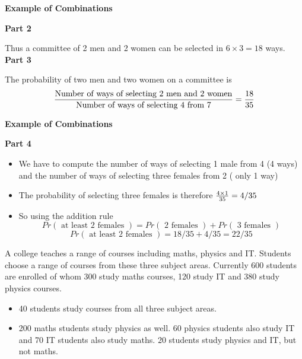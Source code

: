 \documentclass[]{report}
\begin{document}
	
	{
		\textbf{Example of Combinations}
		
		\textbf{Part 2}
		
		Thus a committee of 2 men and 2 women can be selected in $ 6 \times 3  = 18 $ ways.\\
		
		\textbf{Part 3}
		
		The probability of two men and two women on a committee is
		\[ {\mbox{Number of ways of selecting 2 men and 2 women} \over \mbox{Number of ways of selecting 4 from 7}} = {18 \over 35 }\]
		
		

		
		
		\textbf{Example of Combinations}
		
		\textbf{Part 4}
		\begin{itemize}
			\item We have to compute the number of ways of selecting 1 male from 4 (4 ways) and the number of ways of selecting three females from 2 ( only 1 way)
			\item The probability of selecting three females is therefore ${4 \times 1 \over 35} = 4/35$
			\item So using the addition rule
			\[ Pr(\mbox{ at least 2 females }) = Pr(\mbox{ 2 females }) + Pr(\mbox{ 3 females }) \]
			\[ Pr(\mbox{ at least 2 females })  = 18/35 + 4/35 = 22/35 \]
		\end{itemize}
		
	}
	
	
	
	
	
	A college teaches a range of courses including maths, physics and IT.
	Students choose a range of courses from these three subject areas. Currently 600
	students are enrolled of whom 300 study maths courses, 120 study IT
	and 380 study physics courses. 
	
	\begin{itemize}
		\item 40 students study courses from all three subject
		areas. 
		\item 200 maths students study physics as well. 60 physics students
		also study IT and 70 IT students also study maths. 20 students study physics and IT, but not maths.
	\end{itemize}
	
	
	
\end{document}
